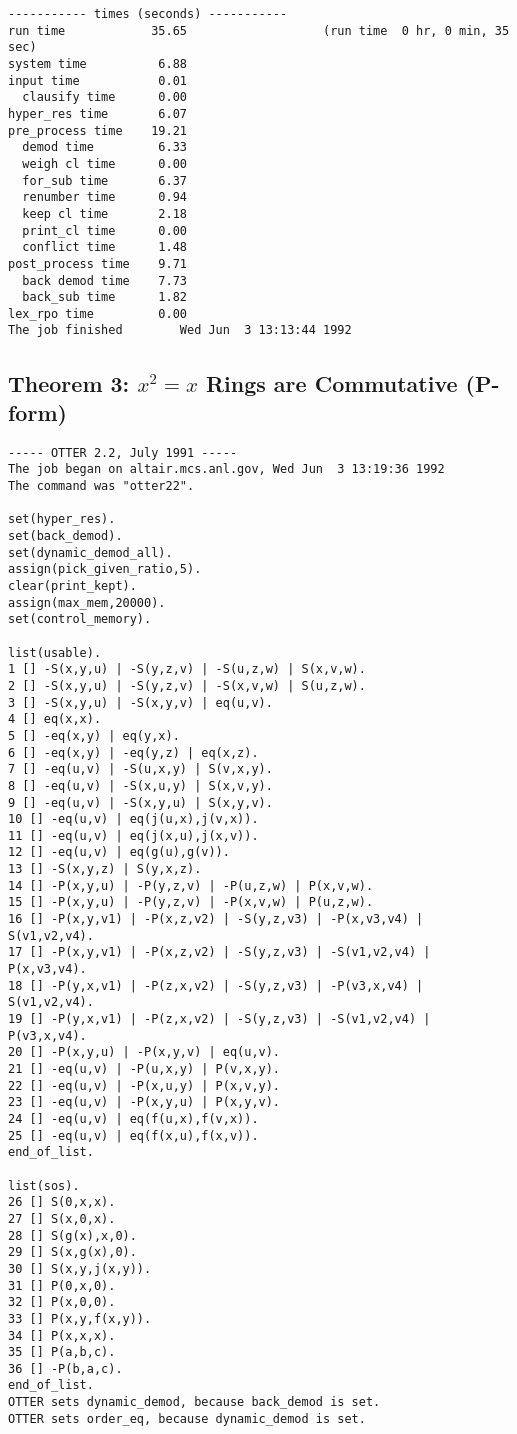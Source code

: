{\begin{verbatim}
----------- times (seconds) -----------
run time            35.65                   (run time  0 hr, 0 min, 35 sec)
system time          6.88
input time           0.01
  clausify time      0.00
hyper_res time       6.07
pre_process time    19.21
  demod time         6.33
  weigh cl time      0.00
  for_sub time       6.37
  renumber time      0.94
  keep cl time       2.18
  print_cl time      0.00
  conflict time      1.48
post_process time    9.71
  back demod time    7.73
  back_sub time      1.82
lex_rpo time         0.00
The job finished        Wed Jun  3 13:13:44 1992
\end{verbatim} }
\subsection{Theorem 3: $x^2=x$ Rings are Commutative (P-form)}
{\small \begin{verbatim}
----- OTTER 2.2, July 1991 -----
The job began on altair.mcs.anl.gov, Wed Jun  3 13:19:36 1992
The command was "otter22".

set(hyper_res).
set(back_demod).
set(dynamic_demod_all).
assign(pick_given_ratio,5).
clear(print_kept).
assign(max_mem,20000).
set(control_memory).

list(usable).
1 [] -S(x,y,u) | -S(y,z,v) | -S(u,z,w) | S(x,v,w).
2 [] -S(x,y,u) | -S(y,z,v) | -S(x,v,w) | S(u,z,w).
3 [] -S(x,y,u) | -S(x,y,v) | eq(u,v).
4 [] eq(x,x).
5 [] -eq(x,y) | eq(y,x).
6 [] -eq(x,y) | -eq(y,z) | eq(x,z).
7 [] -eq(u,v) | -S(u,x,y) | S(v,x,y).
8 [] -eq(u,v) | -S(x,u,y) | S(x,v,y).
9 [] -eq(u,v) | -S(x,y,u) | S(x,y,v).
10 [] -eq(u,v) | eq(j(u,x),j(v,x)).
11 [] -eq(u,v) | eq(j(x,u),j(x,v)).
12 [] -eq(u,v) | eq(g(u),g(v)).
13 [] -S(x,y,z) | S(y,x,z).
14 [] -P(x,y,u) | -P(y,z,v) | -P(u,z,w) | P(x,v,w).
15 [] -P(x,y,u) | -P(y,z,v) | -P(x,v,w) | P(u,z,w).
16 [] -P(x,y,v1) | -P(x,z,v2) | -S(y,z,v3) | -P(x,v3,v4) | S(v1,v2,v4).
17 [] -P(x,y,v1) | -P(x,z,v2) | -S(y,z,v3) | -S(v1,v2,v4) | P(x,v3,v4).
18 [] -P(y,x,v1) | -P(z,x,v2) | -S(y,z,v3) | -P(v3,x,v4) | S(v1,v2,v4).
19 [] -P(y,x,v1) | -P(z,x,v2) | -S(y,z,v3) | -S(v1,v2,v4) | P(v3,x,v4).
20 [] -P(x,y,u) | -P(x,y,v) | eq(u,v).
21 [] -eq(u,v) | -P(u,x,y) | P(v,x,y).
22 [] -eq(u,v) | -P(x,u,y) | P(x,v,y).
23 [] -eq(u,v) | -P(x,y,u) | P(x,y,v).
24 [] -eq(u,v) | eq(f(u,x),f(v,x)).
25 [] -eq(u,v) | eq(f(x,u),f(x,v)).
end_of_list.

list(sos).
26 [] S(0,x,x).
27 [] S(x,0,x).
28 [] S(g(x),x,0).
29 [] S(x,g(x),0).
30 [] S(x,y,j(x,y)).
31 [] P(0,x,0).
32 [] P(x,0,0).
33 [] P(x,y,f(x,y)).
34 [] P(x,x,x).
35 [] P(a,b,c).
36 [] -P(b,a,c).
end_of_list.
OTTER sets dynamic_demod, because back_demod is set.
OTTER sets order_eq, because dynamic_demod is set.


\end{verbatim}}
